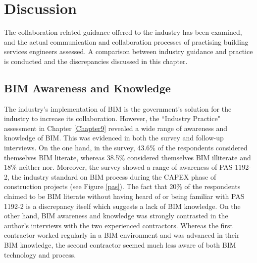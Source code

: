 \chapter{Discussion} %

\label{Chapter10} %


The collaboration-related guidance offered to the industry has been examined, and the actual communication and collaboration processes of practising building services engineers assessed.
A comparison between industry guidance and practice is conducted and the discrepancies discussed in this chapter.



\section{BIM Awareness and Knowledge}


The industry's implementation of BIM is the government's solution for the industry to increase its collaboration.
However, the ``Industry Practice" assessment in Chapter \ref{Chapter9} revealed a wide range of awareness and knowledge of BIM.
This was evidenced in both the survey and follow-up interviews.
On the one hand, in the survey, 43.6\% of the respondents considered themselves BIM literate, whereas 38.5\% considered themselves BIM illiterate and 18\% neither nor.
Moreover, the survey showed a range of awareness of PAS 1192-2, the industry standard on BIM process during the CAPEX phase of construction projects (see Figure \ref{pas}).
The fact that 20\% of the respondents claimed to be BIM literate without having heard of or being familiar with PAS 1192-2 is a discrepancy itself which suggests a lack of BIM knowledge.
On the other hand, BIM awareness and knowledge was strongly contrasted in the author's interviews with the two experienced contractors.
Whereas the first contractor worked regularly in a BIM environment and was advanced in their BIM knowledge, the second contractor seemed much less aware of both BIM technology and process.

